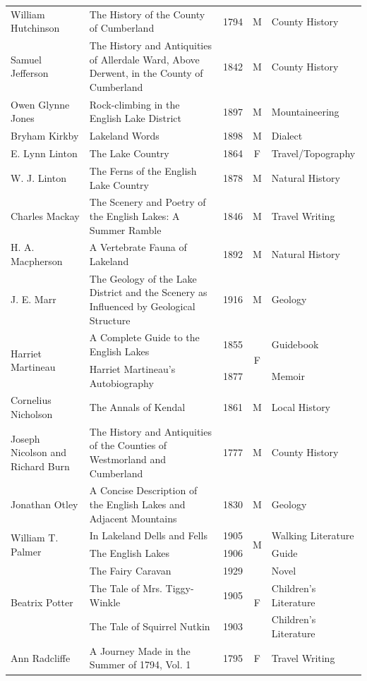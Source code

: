 \begin{longtable}{@{}p{3.2cm} p{5.0cm} c c p{3.2cm}@{}}
William Hutchinson & The History of the County of Cumberland & 1794 & M & County History \\
Samuel Jefferson & The History and Antiquities of Allerdale Ward, Above Derwent, in the County of Cumberland & 1842 & M & County History \\
Owen Glynne Jones & Rock-climbing in the English Lake District & 1897 & M & Mountaineering \\
Bryham Kirkby & Lakeland Words & 1898 & M & Dialect \\
E. Lynn Linton & The Lake Country & 1864 & F & Travel/Topography \\
W. J. Linton & The Ferns of the English Lake Country & 1878 & M & Natural History \\
Charles Mackay & The Scenery and Poetry of the English Lakes: A Summer Ramble & 1846 & M & Travel Writing \\
H. A. Macpherson & A Vertebrate Fauna of Lakeland & 1892 & M & Natural History \\
J. E. Marr & The Geology of the Lake District and the Scenery as Influenced by Geological Structure & 1916 & M & Geology \\
\multirow[t]{2}{3.2cm}{Harriet Martineau} & A Complete Guide to the English Lakes & 1855 & \multirow[t]{2}{*}{F} & Guidebook \\
 & Harriet Martineau's Autobiography & 1877 &  & Memoir \\
Cornelius Nicholson & The Annals of Kendal & 1861 & M & Local History \\
Joseph Nicolson and Richard Burn & The History and Antiquities of the Counties of Westmorland and Cumberland & 1777 & M & County History \\
Jonathan Otley & A Concise Description of the English Lakes and Adjacent Mountains & 1830 & M & Geology \\
\multirow[t]{2}{3.2cm}{William T. Palmer} & In Lakeland Dells and Fells & 1905 & \multirow[t]{2}{*}{M} & Walking Literature \\
 & The English Lakes & 1906 &  & Guide \\
\multirow[t]{3}{3.2cm}{Beatrix Potter} & The Fairy Caravan & 1929 & \multirow[t]{3}{*}{F} & Novel \\
 & The Tale of Mrs. Tiggy-Winkle & 1905 &  & Children's Literature \\
 & The Tale of Squirrel Nutkin & 1903 &  & Children's Literature \\
Ann Radcliffe & A Journey Made in the Summer of 1794, Vol. 1 & 1795 & F & Travel Writing \\

\end{longtable}
